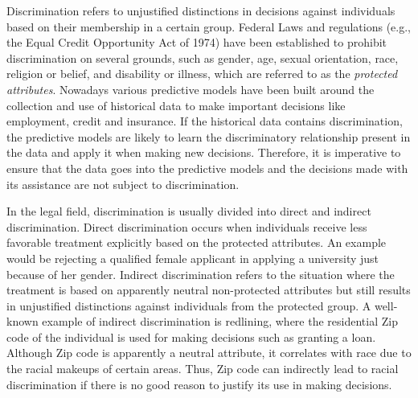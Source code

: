 \documentclass[letterpaper]{article}
\begin{document}
Discrimination refers to unjustified distinctions in decisions against individuals based on their membership in a certain group. Federal Laws and regulations (e.g., the Equal Credit Opportunity Act of 1974) have been established to prohibit discrimination on several grounds, such as gender, age, sexual orientation, race, religion or belief, and disability or illness, which are referred to as the \emph{protected attributes}. Nowadays various predictive models have been built around the collection and use of historical data to make important decisions like employment, credit and insurance. If the historical data contains discrimination, the predictive models are likely to learn the discriminatory relationship present in the data and apply it when making new decisions. Therefore, it is imperative to ensure that the data goes into the predictive models and the decisions made with its assistance are not subject to discrimination.

In the legal field, discrimination is usually divided into direct and indirect discrimination. Direct discrimination occurs when individuals receive less favorable treatment explicitly based on the protected attributes. An example would be rejecting a qualified female applicant in applying a university just because of her gender. Indirect discrimination refers to the situation where the treatment is based on apparently neutral non-protected attributes but still results in unjustified distinctions against individuals from the protected group. A well-known example of indirect discrimination is redlining, where the residential Zip code of the individual is used for making decisions such as granting a loan. Although Zip code is apparently a neutral attribute, it correlates with race due to the racial makeups of certain areas. Thus, Zip code can indirectly lead to racial discrimination if there is no good reason to justify its use in making decisions.
\end{document}
